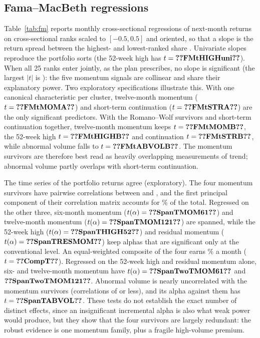 \documentclass[11pt]{article}
\newcommand{\RW}{Romano--Wolf}
\begin{document}
\subsection{Fama--MacBeth regressions}\label{sec:fm}

Table~\ref{tab:fm} reports monthly cross-sectional regressions of next-month returns on cross-sectional ranks scaled to
$[-0.5,0.5]$ and oriented, so that a slope is the return spread between the highest- and lowest-ranked share
\citep{fama1973risk}. Univariate slopes reproduce the portfolio sorts (the 52-week high has $t=\val{FMtHIGHuni}$). When
all 25 ranks enter jointly, as the plan prescribes, no slope is significant (the largest $|t|$ is ):
the five momentum signals are collinear and share their explanatory power. Two exploratory specifications illustrate
this. With one canonical characteristic per cluster, twelve-month momentum ($t=\val{FMtMOMA}$) and short-term
continuation ($t=\val{FMtSTRA}$) are the only significant predictors. With the \RW{} survivors and short-term
continuation together, twelve-month momentum keeps $t=\val{FMtMOMB}$, the 52-week high $t=\val{FMtHIGHB}$ and
continuation $t=\val{FMtSTRB}$, while abnormal volume falls to $t=\val{FMtABVOLB}$. The momentum survivors are therefore
best read as heavily overlapping measurements of trend; abnormal volume partly overlaps with short-term continuation.

The time series of the portfolio returns agree (exploratory). The four momentum survivors have pairwise correlations
between  and , and the first principal component of their correlation matrix accounts
for \% of the total. Regressed on the other three, six-month momentum ($t(\alpha)=\val{SpanTMOM61}$)
and twelve-month momentum ($t(\alpha)=\val{SpanTMOM121}$) are spanned, while the 52-week high
($t(\alpha)=\val{SpanTHIGH52}$) and residual momentum ($t(\alpha)=\val{SpanTRESMOM}$) keep alphas that are significant
only at the conventional level. An equal-weighted composite of the four earns \% a month
($t=\val{CompT}$). Regressed on the 52-week high and residual momentum alone, six- and
twelve-month momentum have $t(\alpha)=\val{SpanTwoTMOM61}$ and $\val{SpanTwoTMOM121}$. Abnormal volume is nearly
uncorrelated with the momentum survivors (correlations of  or less), and its alpha against them
has $t=\val{SpanTABVOL}$. These tests do not establish the exact number of distinct
effects, since an insignificant incremental alpha is also what weak power would produce, but they show that the four
survivors are largely redundant: the robust evidence is one momentum family, plus a fragile high-volume premium.
\end{document}
